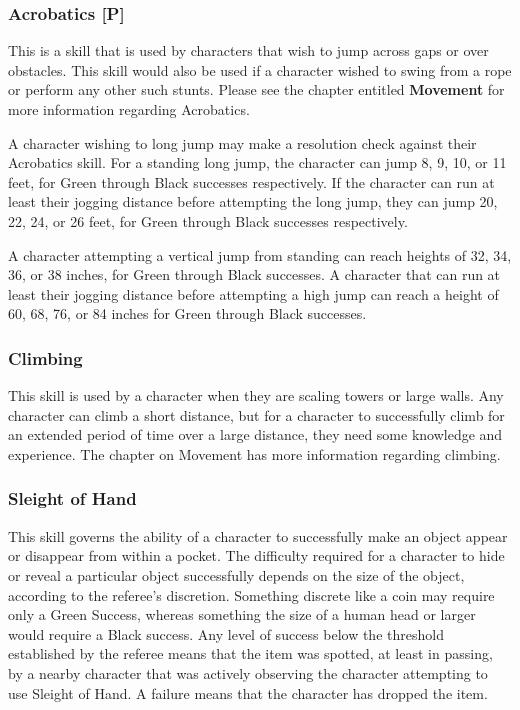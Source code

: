 \documentclass[oneside]{book}
\begin{document}
\begin{multicols}{2}
\subsubsection{Acrobatics [P]}
This is a skill that is used by characters that wish to jump across gaps or over obstacles. This skill would also be used if a character wished to swing from a rope or perform any other such stunts. Please see the chapter entitled \textbf{Movement} for more information regarding Acrobatics.

A character wishing to long jump may make a resolution check against their Acrobatics skill. For a standing long jump, the character can jump 8, 9, 10, or 11 feet, for Green through Black successes respectively.
If the character can run at least their jogging distance before attempting the long jump, they can jump 20, 22, 24, or 26 feet, for Green through Black successes respectively.

A character attempting a vertical jump from standing can reach heights of 32, 34, 36, or 38 inches, for Green through Black successes. A character that can run at least their jogging distance before attempting a high jump can reach a height of 60, 68, 76, or 84 inches for Green through Black successes.
\subsubsection{Climbing}
This skill is used by a character when they are scaling towers or large walls. Any character can climb a short distance, but for a character to successfully climb for an extended period of time over a large distance, they need some knowledge and experience. The chapter on Movement has more information regarding climbing. 

\subsubsection{Sleight of Hand}
This skill governs the ability of a character to successfully make an object appear or disappear from within a pocket. The difficulty required for a character to hide or reveal a particular object successfully depends on the size of the object, according to the referee's discretion. Something discrete like a coin may require only a Green Success, whereas something the size of a human head or larger would require a Black success. Any level of success below the threshold established by the referee means that the item was spotted, at least in passing, by a nearby character that was actively observing the character attempting to use Sleight of Hand. A failure means that the character has dropped the item. 


\end{multicols}
\end{document}
